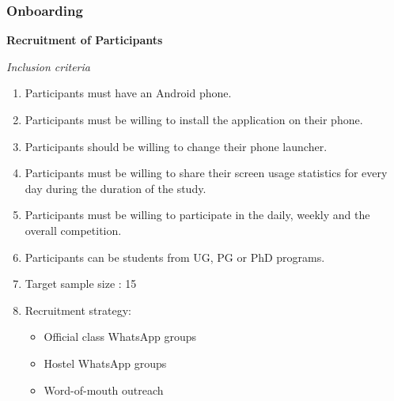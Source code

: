 \documentclass{article}
\begin{document}
\subsubsection{Onboarding}

\textbf{Recruitment of Participants}

\textit{Inclusion criteria}
\begin{enumerate}
    \item Participants must have an Android phone.
    \item Participants must be willing to install the application on their phone.
    \item Participants should be willing to change their phone launcher.
    \item Participants must be willing to share their screen usage statistics for every day during the duration of the study.
    \item Participants must be willing to participate in the daily, weekly and the overall competition.
    \item Participants can be students from UG, PG or PhD programs.
    \item Target sample size : 15
    \item Recruitment strategy:
    \begin{itemize}
        \item Official class WhatsApp groups
        \item Hostel WhatsApp groups
        \item Word-of-mouth outreach
    \end{itemize}
\end{enumerate}
\end{document}
